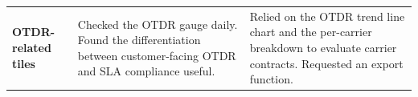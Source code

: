 \documentclass{imc-inf}
\begin{document}
\begin{longtable}{@{}>{\raggedright\arraybackslash}p{3cm}p{5.75cm}p{5.75cm}@{}}
  \textbf{OTDR-related tiles}                                                                                                                                                                                                                                                                                                                                                                                                                                                                                                                                                                                                                                                                                                                                                                                                                                                                                  &
  Checked the OTDR gauge daily. Found the differentiation between customer-facing OTDR and SLA compliance useful.                                                                                                                                                                                                                                                                                                                                                                                                                                                                                                                                                                                                                                                                                                                                                                                              &
  Relied on the OTDR trend line chart and the per-carrier breakdown to evaluate carrier contracts. Requested an export function.                                                                                                                                                                                                                                                                                                                                                                                                                                                                                                                                                                                                                                                                                                                                                                                                                           \\[6pt]


\end{longtable}
\end{document}
